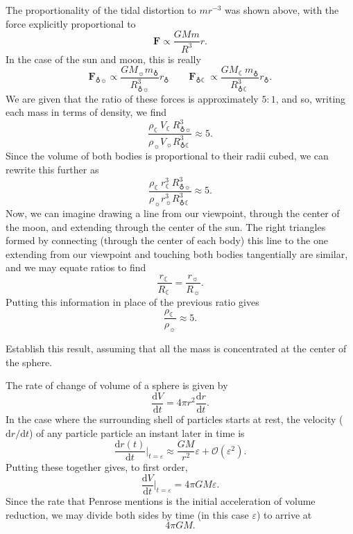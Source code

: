 \documentclass[../the-road-to-reality.tex]{subfiles}
\begin{document}
\begin{questions}
	\begin{solution}
		The proportionality of the tidal distortion to $mr^{-3}$ was shown above, with the force explicitly proportional to
		\[
			\mathbf{F} \propto \frac{GMm}{R^3}r
		.\] 
		In the case of the sun and moon, this is really
		\[
			\mathbf{F}_{\earth\sun} \propto \frac{GM_{\sun}m_{\earth}}{R_{\earth\sun}^3}r_{\earth} \qquad \mathbf{F}_{\earth\leftmoon} \propto \frac{GM_{\leftmoon}m_{\earth}}{R_{\earth\leftmoon}^3}r_{\earth}
		.\] 
		We are given that the ratio of these forces is approximately $5:1$, and so, writing each mass in terms of density, we find
		\[
			\frac{\rho_{\leftmoon}V_{\leftmoon}R_{\earth\sun}^3}{\rho_{\sun}V_{\sun}R_{\earth\leftmoon}^3} \approx 5
		.\] 
		Since the volume of both bodies is proportional to their radii cubed, we can rewrite this further as
		\[
			\frac{\rho_{\leftmoon}r_{\leftmoon}^3R_{\earth\sun}^3}{\rho_{\sun}r_{\sun}^3R_{\earth\leftmoon}^3} \approx 5
		.\] 
		Now, we can imagine drawing a line from our viewpoint, through the center of the moon, and extending through the center of the sun. The right triangles formed by connecting (through the center of each body) this line to the one extending from our viewpoint and touching both bodies tangentially are similar, and we may equate ratios to find
		\[
			\frac{r_{\leftmoon}}{R_{\leftmoon}} = \frac{r_{\sun}}{R_{\sun}}
		.\] 
		Putting this information in place of the previous ratio gives
		\[
			\frac{\rho_{\leftmoon}}{\rho_{\sun}} \approx 5
		.\] 
	\end{solution}

	\question Establish this result, assuming that all the mass is concentrated at the center of the sphere.

	\begin{solution}
		The rate of change of volume of a sphere is given by
		\[
			\frac{\mathrm{d}V}{\mathrm{d}t} = 4\pi{r^2}\frac{\mathrm{d}r}{\mathrm{d}t}
		.\] 
		In the case where the surrounding shell of particles starts at rest, the velocity ($\mathrm{d}r/\mathrm{d}t$) of any particle particle an instant later in time is
		\[
			\frac{\mathrm{d}r(t)}{\mathrm{d}t}\Big|_{t=\varepsilon} \approx \frac{GM}{r^2}\varepsilon + \mathcal{O}(\varepsilon^2)
		.\] 
		Putting these together gives, to first order,
		\[
			\frac{\mathrm{d}V}{\mathrm{d}t}\Big|_{t=\varepsilon} = 4\pi{GM}\varepsilon
		.\] 
		Since the rate that Penrose mentions is the initial acceleration of volume reduction, we may divide both sides by time (in this case $\varepsilon$) to arrive at
		\[
			4\pi{GM}
		.\] 
	\end{solution}


\end{questions}
\end{document}
